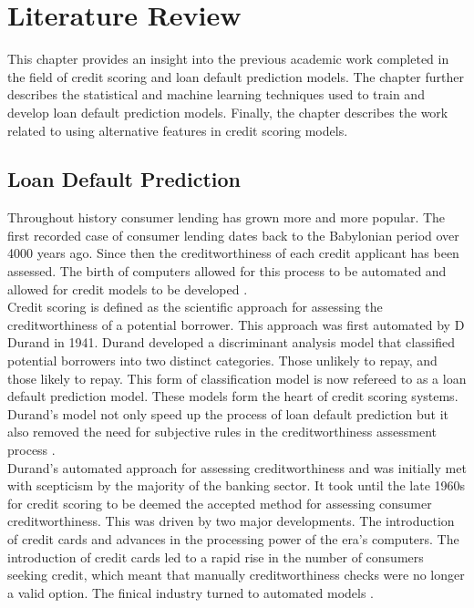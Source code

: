 \chapter{Literature Review} 
\label{Chapter2}

This chapter provides an insight into the previous academic work completed in the field of credit scoring and loan default prediction models. The chapter further describes the statistical and machine learning techniques used to train and develop loan default prediction models. Finally, the chapter describes the work related to using alternative features in credit scoring models. 


\section{Loan Default Prediction}

Throughout history consumer lending has grown more and more popular. The first recorded case of consumer lending dates back to the Babylonian period over 4000 years ago. Since then the creditworthiness of each credit applicant has been assessed. The birth of computers allowed for this process to be automated and allowed for credit models to be developed \parencite{CreditScoringIntroLewis}. \\

Credit scoring is defined as the scientific approach for assessing the creditworthiness of a potential borrower. This approach was first automated by D Durand in 1941. Durand developed a discriminant analysis model that classified potential borrowers into two distinct categories. Those unlikely to repay, and those likely to repay. This form of classification model is now refereed to as a loan default prediction model. These models form the heart of credit scoring systems. Durand's model not only speed up the process of loan default prediction but it also removed the need for subjective rules in the creditworthiness assessment process \parencite{CreditScoringIntroThomas}. \\

Durand's automated approach for assessing creditworthiness and was initially met with scepticism by the majority of the banking sector. It took until the late 1960s for credit scoring to be deemed the accepted method for assessing consumer creditworthiness. This was driven by two major developments. The introduction of credit cards and advances in the processing power of the era's computers. The introduction of credit cards led to a rapid rise in the number of consumers seeking credit, which meant that manually creditworthiness checks were no longer a valid option. The finical industry turned to automated models \parencite{CreditScoringIntroMarquez}. \\

